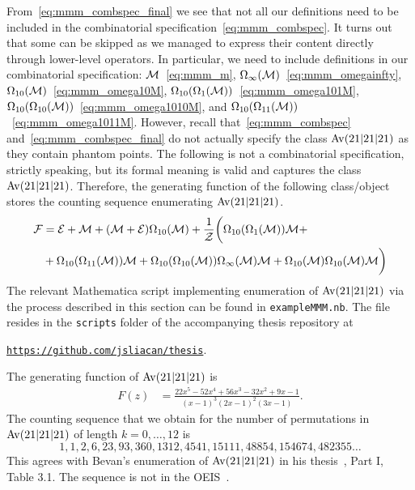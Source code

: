 \documentclass[12pt, a4paper, twoside]{report}
\begin{document}
From~\eqref{eq:mmm_combspec_final} we see that not all our definitions need to be included in the combinatorial specification~\eqref{eq:mmm_combspec}. It turns out that some can be skipped as we managed to express their content directly through lower-level operators. In particular, we need to include definitions in our combinatorial specification: $\mathcal{M}$~\eqref{eq:mmm_m}, $\Omega_\infty(\mathcal{M})$~\eqref{eq:mmm_omegainfty}, $\Omega_{10}(\mathcal{M})$~\eqref{eq:mmm_omega10M}, $\Omega_{10}(\Omega_1(\mathcal{M}))$~\eqref{eq:mmm_omega101M}, $\Omega_{10}(\Omega_{10}(\mathcal{M}))$~\eqref{eq:mmm_omega1010M}, and $\Omega_{10}(\Omega_{11}(\mathcal{M}))$~\eqref{eq:mmm_omega1011M}. However, recall that~\eqref{eq:mmm_combspec} and~\eqref{eq:mmm_combspec_final} do not actually specify the class $\mathrm{Av}(21|21|21)$ as they contain phantom points. The following is not a combinatorial specification, strictly speaking, but its formal meaning is valid and captures the class $\mathrm{Av}(21|21|21)$. Therefore, the generating function of the following class/object stores the counting sequence enumerating $\mathrm{Av}(21|21|21)$.
\begin{align}
  \begin{aligned}
\mathcal{F} &=\mathcal{E} + \mathcal{M} + (\mathcal{M} + \mathcal{E})\Omega_{10}(\mathcal{M}) +\frac{1}{\mathcal{Z}}\bigg(\Omega_{10}(\Omega_1(\mathcal{M}))\mathcal{M} +\\
     &+\Omega_{10}(\Omega_{11}(\mathcal{M}))\mathcal{M} +\Omega_{10}(\Omega_{10}(\mathcal{M}))\Omega_\infty(\mathcal{M})\mathcal{M} + \Omega_{10}(\mathcal{M})\Omega_{10}(\mathcal{M})\mathcal{M}\bigg)
   \end{aligned}
\label{eq:mmm_F_final}
\end{align}
The relevant Mathematica script implementing enumeration of $\mathrm{Av}(21|21|21)$ via the process described in this section can be found in \texttt{exampleMMM.nb}. The file resides in the \texttt{scripts} folder of the accompanying thesis repository at

\begin{center}\href{https://github.com/jsliacan/thesis}{\texttt{https://github.com/jsliacan/thesis}}.\end{center}

The generating function of $\mathrm{Av}(21|21|21)$ is
\begin{align}
  F(z) &= \frac{22x^5-52x^4+56x^3-32x^2+9x-1}{(x-1)^3(2x-1)^2(3x-1)}.
\end{align}
The counting sequence that we obtain for the number of permutations in $\mathrm{Av}(21|21|21)$ of length $k=0,\ldots,12$ is $$1, 1, 2, 6, 23, 93, 360, 1312, 4541, 15111, 48854, 154674, 482355\ldots$$
This agrees with Bevan's enumeration of $\mathrm{Av}(21|21|21)$ in his thesis~\cite{bevan2015thesis}, Part I, Table 3.1. The sequence is not in the OEIS~\cite{oeis}.
\end{document}
